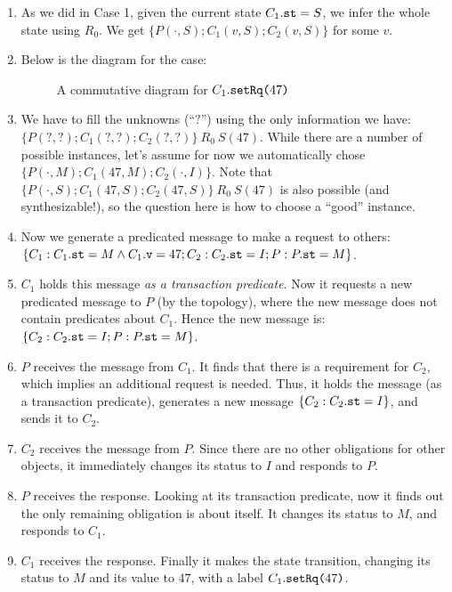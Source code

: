 \documentclass[format=manuscript]{acmart}
\begin{document}
\begin{enumerate}
\item As we did in Case 1, given the current state $C_1.\texttt{st} = S$, we infer
  the whole state using $R_0$. We get $\{ P(\cdot, S); C_1(v, S); C_2(v, S) \}$
  for some $v$.
\item Below is the diagram for the case:
  \begin{figure}[h]
    \caption{A commutative diagram for $C_1.\texttt{setRq(}47\texttt{)}$}
    \label{fig:comm-diagram-setrq}
  \end{figure}
\item We have to fill the unknowns (``$?$'') using the only information we have:
  $\{ P(?, ?); C_1(?, ?); C_2(?, ?) \}\ R_0\ S(47)$. While there are a number of
  possible instances, let's assume for now we automatically chose $\{ P(\cdot,
  M); C_1(47, M); C_2(\cdot, I) \}$. Note that $\{ P(\cdot, S); C_1(47, S);
  C_2(47, S) \}\ R_0\ S(47)$ is also possible (and synthesizable!), so the
  question here is how to choose a ``good'' instance.
\item Now we generate a predicated message to make a request to others: $\{ C_1:
  C_1.\texttt{st} = M \wedge C_1.\texttt{v} = 47; C_2: C_2.\texttt{st} = I; P: P.\texttt{st} = M
  \}$.
\item $C_1$ holds this message \emph{as a transaction predicate}. Now it
  requests a new predicated message to $P$ (by the topology), where the new
  message does not contain predicates about $C_1$. Hence the new message is: $\{
  C_2: C_2.\texttt{st} = I; P: P.\texttt{st} = M \}$.
\item $P$ receives the message from $C_1$. It finds that there is a requirement
  for $C_2$, which implies an additional request is needed. Thus, it holds the
  message (as a transaction predicate), generates a new message $\{ C_2:
  C_2.\texttt{st} = I \}$, and sends it to $C_2$.
\item $C_2$ receives the message from $P$. Since there are no other obligations
  for other objects, it immediately changes its status to $I$ and responds to
  $P$.
\item $P$ receives the response. Looking at its transaction predicate, now it
  finds out the only remaining obligation is about itself. It changes its status
  to $M$, and responds to $C_1$.
\item $C_1$ receives the response. Finally it makes the state transition,
  changing its status to $M$ and its value to $47$, with a label
  $C_1.\texttt{setRq(}47\texttt{)}$.
\end{enumerate}
\end{document}
